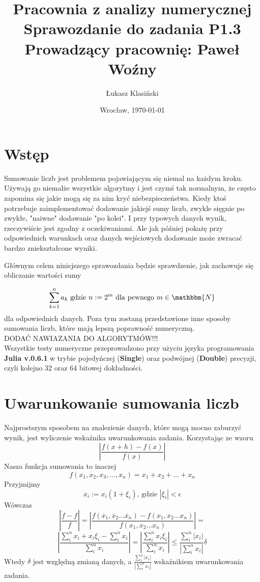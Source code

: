 \documentclass[11pt, wide]{article}
\date{Wrocław, \today}
\title{\LARGE\textbf{Pracownia z analizy numerycznej}\\Sprawozdanie do zadania \textbf{P1.3}\\
    Prowadzący pracownię: Paweł Woźny}
\author{Łukasz Klasiński}
\begin{document}
    \maketitle
    \thispagestyle{empty}
    \section{Wstęp}
    Sumowanie liczb jest problemem pojawiającym się niemal na każdym kroku. Używają go niemalże wszystkie algorytmy 
    i jest czymś tak normalnym, że często zapomina się jakie mogą się za nim kryć niebezpieczeństwa.
    Kiedy ktoś potrzebuje zaimplementować dodawanie jakiejś sumy liczb, zwykle sięgnie po zwykłe, "naiwne" dodawanie "po kolei".
    I przy typowych danych wynik, rzeczywiście jest zgodny z oczekiwaniami. Ale jak później pokażę przy odpowiednich warunkach oraz danych wejściowych
    dodawanie może zwracać bardzo zniekształcone wyniki.

    Głównym celem niniejszego sprawozdania będzie sprawdzenie, jak zachowuje się obliczanie wartości sumy
    
    \begin{equation}\label{sum_eq}
        \sum_{k=1}^{n}a_{k} \text{ gdzie } n := 2^m \text{ dla pewnego }m \in \mathbbm{N} 
    \end{equation}
    dla odpowiednich danych. Poza tym zostaną przedstawione inne sposoby sumowania liczb, które mają lepszą poprawność numeryczną.
    \\
    DODAĆ NAWIAZANIA DO ALGORYTMÓW!!!
    \\
    Wszystkie testy numeryczne przeprowadzono przy użyciu języka programowania \textbf{Julia v.0.6.1} w trybie 
    pojedyńczej (\textbf{Single}) oraz podwójnej (\textbf{Double}) precyzji, czyli kolejno 32 oraz 64 bitowej dokładności.
    
    \section{Uwarunkowanie sumowania liczb}
    Najprostszym sposobem na znalezienie danych, które mogą mocno zaburzyć wynik, jest 
    wyliczenie wskaźnika uwarunkowania zadania. Korzystając ze wzoru
\begin{equation}
    |\frac{f(x + h) - f(x)}{f(x)}|
\end{equation}
    Nasza funkcja sumowania to inaczej  $$ f(x_1, x_2, x_3, \ldots, x_n) = x_1 + x_2 + \ldots + x_n $$
    Przyjmijmy $$\ddot{x_i} := x_i(1 + \xi_i) \text{, gdzie } |\xi_i| < \epsilon $$
    Wówczas
$$
    |\frac{\ddot{f} - f}{f}| = |\frac{f(\ddot{x_1},\ddot{x_2} \ldots \ddot{x_n}) - f(x_1, x_2 \ldots x_n)}{f(x_1,x_2 \ldots x_n)}| = 
$$
$$
    |\frac{\sum_i^{n}x_i + x_i\xi_i - \sum_i^{n}x_i}{\sum_i^{n}x_i}| = 
    |\frac{\sum_i^{n}x_i\xi_i}{\sum_i^{n}x_i}| \leq  \frac{\sum_i^{n}|x_i|}{|\sum_i^{n}x_i|}\delta
$$
    Wtedy $\delta$ jest względną zmianą danych, a $\frac{\sum_i^{n}|x_i|}{|\sum_i^{n}x_i|}$ 
    wskaźnikiem uwarunkowania zadania.
\end{document}
